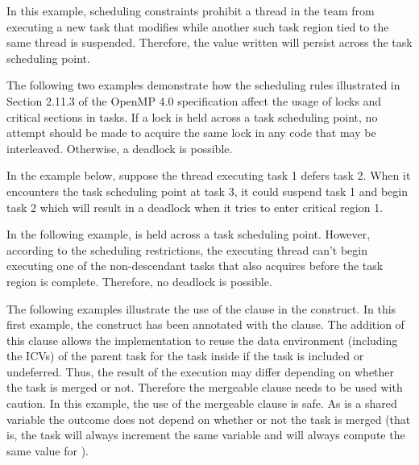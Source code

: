 

In this example, scheduling constraints prohibit a thread in the team from executing 
a new task that modifies   while another such task region tied to the 
same thread is suspended. Therefore, the value written will persist across the 
task scheduling point.



The following two examples demonstrate how the scheduling rules illustrated in 
Section 2.11.3 of the OpenMP 4.0 specification affect the usage of locks 
and critical sections in tasks.  If a lock is held 
across a task scheduling point, no attempt should be made to acquire the same lock 
in any code that may be interleaved.  Otherwise, a deadlock is possible.

In the example below, suppose the thread executing task 1 defers task 2.  When 
it encounters the task scheduling point at task 3, it could suspend task 1 and 
begin task 2 which will result in a deadlock when it tries to enter critical region 
1.



In the following example,  is held across a task scheduling point. 
 However, according to the scheduling restrictions, the executing thread can't 
begin executing one of the non-descendant tasks that also acquires  before 
the task region is complete.  Therefore, no deadlock is possible.


\clearpage

The following examples illustrate the use of the  clause in the 
 construct. In this first example, the  construct has 
been annotated with the   clause. The addition of this clause 
allows the implementation to reuse the data environment (including the ICVs) of 
the parent task for the task inside  if the task is included or undeferred. 
Thus, the result of the execution may differ depending on whether the task is merged 
or not. Therefore the mergeable clause needs to be used with caution. In this example, 
the use of the mergeable clause is safe. As  is a shared variable the 
outcome does not depend on whether or not the task is merged (that is, the task 
will always increment the same variable and will always compute the same value 
for ).

